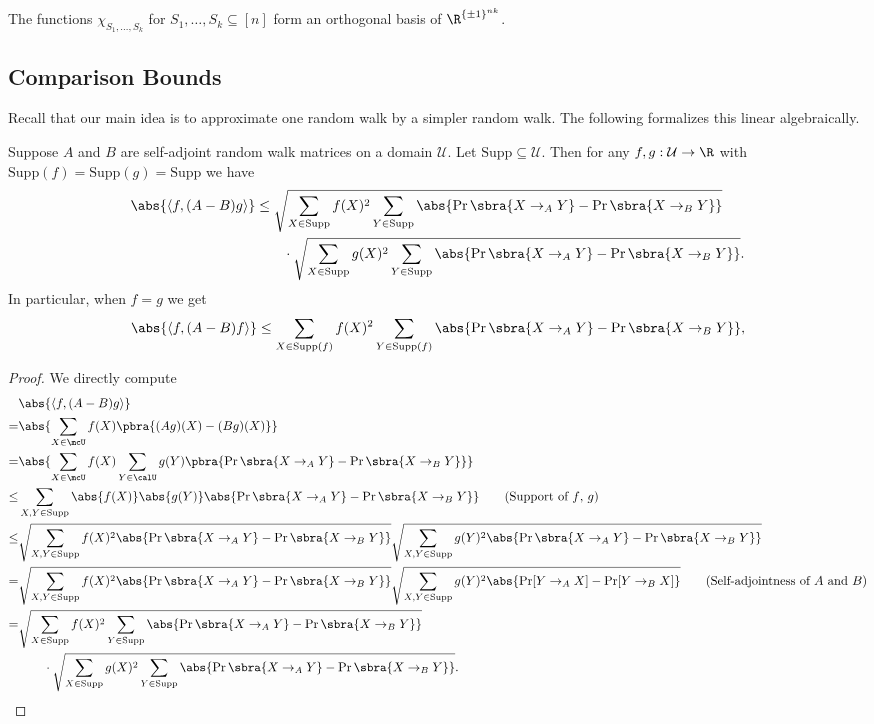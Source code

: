 \begin{fact}\label{fact:fourier characters}
    The functions $\chi_{S_1,\dots,S_k}$ for $S_1,\dots,S_k\subseteq[n]$ form an orthogonal basis of $\R^{\{\pm1\}^{nk}}$.
\end{fact}

\subsection{Comparison Bounds}
Recall that our main idea is to approximate one random walk by a simpler random walk. The following  formalizes this linear algebraically.
\begin{lemma}\label{lem:TV distance bound}
    Suppose $A$ and $B$ are self-adjoint random walk matrices on a domain $\mathcal{U}$. Let $\mathrm{Supp}\subseteq\mathcal{U}$. Then for any $f,g:\mathcal{U}\to\R$ with $\mathrm{Supp}(f)=\mathrm{Supp}(g)=\mathrm{Supp}$ we have
    \begin{align*}
        \abs{\left\langle f, (A-B)g\right\rangle}
        &\leq \sqrt{\sum_{X\in \mathrm{Supp}}f(X)^2\sum_{Y\in \mathrm{Supp}}\abs{\Pr\sbra{X\to_A Y}-\Pr\sbra{X\to_B Y}}}
         \\
         &\qquad\cdot\sqrt{\sum_{X\in \mathrm{Supp}}g(X)^2\sum_{Y\in \mathrm{Supp}}\abs{\Pr\sbra{X\to_A Y}-\Pr\sbra{X\to_B Y}}}.
    \end{align*}    
    In particular, when $f=g$ we get
    \begin{align*}
        \abs{\left\langle f, (A-B)f\right\rangle}\leq \sum_{X\in \mathrm{Supp}(f)}f(X)^2\sum_{Y\in \mathrm{Supp}(f)}\abs{\Pr\sbra{X\to_A Y}-\Pr\sbra{X\to_B Y}},
    \end{align*}
\end{lemma}
\begin{proof}
    We directly compute
\begin{align*}
        &\abs{\left\langle f,(A-B)g\right\rangle}\\
        =&\abs{\sum_{X\in \mcU}f(X)\pbra{(Ag)(X)-(Bg)(X)}}\\
        =&\abs{\sum_{X\in \mcU}{f(X)\sum_{Y\in \calU}g(Y)\pbra{\Pr\sbra{X\to_A Y}-\Pr\sbra{X\to_B Y}}}}\\
        \leq & \sum_{X,Y\in \mathrm{Supp}}\abs{f({X})}\abs{g( Y)}\abs{\Pr\sbra{X\to_A Y}-\Pr\sbra{X\to_B Y}}\tag{Support of $f$, $g$}\\
        \leq & \sqrt{\sum_{X,Y\in \mathrm{Supp}}f(X)^2\abs{\Pr\sbra{X\to_A Y}-\Pr\sbra{X\to_B Y}}}\sqrt{\sum_{X,Y\in \mathrm{Supp}}g(Y)^2\abs{\Pr\sbra{X\to_A Y}-\Pr\sbra{X\to_B Y}}}\\
        = & \sqrt{\sum_{X,Y\in \mathrm{Supp}}f(X)^2\abs{\Pr\sbra{X\to_A Y}-\Pr\sbra{X\to_B Y}}}\sqrt{\sum_{X,Y\in \mathrm{Supp}}g(Y)^2\abs{\Pr[Y \to_A X]-\Pr[Y \to_B X]}}\tag{Self-adjointness of $A$ and $B$}\\
        = & \sqrt{\sum_{X\in \mathrm{Supp}}f(X)^2\sum_{Y\in \mathrm{Supp}}\abs{\Pr\sbra{X\to_A Y}-\Pr\sbra{X\to_B Y}}}\\
        &\qquad\cdot\sqrt{\sum_{X\in \mathrm{Supp}}g(X)^2\sum_{Y\in \mathrm{Supp}}\abs{\Pr\sbra{X\to_A Y}-\Pr\sbra{X\to_B Y}}}.
    \end{align*}
\end{proof}


